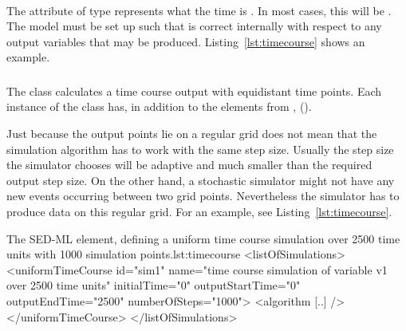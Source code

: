 \paragraph*{}
\label{sec:initialTime}
The attribute  of type  represents what the time is .  In most cases, this will be .  The model must be set up such that  is correct internally with respect to any output variables that may be produced.
Listing~\ref{lst:timecourse} shows an example. 



\subsubsection{}
\label{class:uniformTimeCourse}
The \UniformTimeCourse class calculates a time course output with equidistant time points. Each instance of the \UniformTimeCourse class has, in addition to the elements from  \hyperref[sec:outputStartTime]{},  ().

Just because the output points lie on a regular grid does not mean that the simulation algorithm has to work with the same step size. Usually the step size the simulator chooses will be adaptive and much smaller than the required output step size. On the other hand, a stochastic simulator might not have any new events occurring between two grid points. Nevertheless the simulator has to produce data on this regular grid. For an example, see Listing~\ref{lst:timecourse}.

\begin{myXmlLst}{The SED-ML  element, defining a uniform time course simulation over 2500 time units with 1000 simulation points.}{lst:timecourse}
<listOfSimulations>
	<uniformTimeCourse id="sim1"  name="time course simulation of variable v1 over 2500 time units"  
		initialTime="0" outputStartTime="0" outputEndTime="2500" numberOfSteps="1000">
		<algorithm [..] />
 	</uniformTimeCourse>
</listOfSimulations>
\end{myXmlLst}

